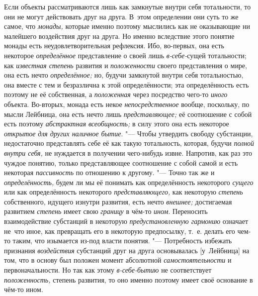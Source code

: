 Если объекты рассматриваются лишь как замкнутые внутри себя
тотальности, то они не могут действовать друг на друга. В~этом определении
они суть то же самое, что {\em монады,}
которые именно поэтому мыслились как не оказывающие ни
малейшего воздействия друг на друга. Но именно вследствие этого понятие
монады есть неудовлетворительная рефлексия. Ибо, во-первых, она есть
некоторое {\em определённое} представление о своей лишь {\em в-себе-}сущей
тотальности; как {\em известная степень} развития и {\em положенности} своего
представления о мире, она есть нечто {\em определённое;} но,
будучи замкнутой внутри себя тотальностью, она вместе с тем и безразлична к
этой определённости; эта определённость есть поэтому не её собственная, а
{\em положенная} через посредство чего-то {\em иного}
объекта. Во-вторых, монада есть некое {\em непосредственное}
вообще, поскольку, по мысли Лейбница, она есть нечто лишь
{\em представляющее;} её соотношение с собой есть поэтому
{\em абстрактная всеобщность;} в силу этого она есть некоторое
{\em открытое} {\em для других наличное бытие}. "---
Чтобы утвердить свободу субстанции, недостаточно представлять
себе её как такую тотальность, которая, будучи {\em полной внутри себя,}
не нуждается в получении чего-нибудь извне. Напротив, как раз
это чуждое понятию, только представляющее соотношение с собой самой и есть
некоторая {\em пассивность} по отношению к другому. "--- Точно так же и
{\em определённость,} будем ли мы её понимать как определённость некоторого
{\em сущего} или как определённость некоторого {\em представляющего,}
как некоторую {\em степень} собственного, идущего изнутри развития, есть нечто
{\em внешнее;} достигаемая развитием {\em степень} имеет свою
{\em границу} в чём-то {\em ином}. Переносить
взаимодействие субстанций в некоторую
{\em предустановленную гармонию}
означает не~что иное, как превращать его в некоторую
предпосылку, т.~е. делать его чем-то таким, что изымается из-под власти
понятия. "--- Потребность избежать признания {\em воздействия}
субстанций друг на друга основывалась [у~Лейбница] на том,
что в основу был положен момент абсолютной
{\em самостоятельности} и первоначальности. Но так как этому
{\em в-себе-бытию} не соответствует {\em положенность,}
степень развития, то оно именно поэтому имеет своё основание в чём-то ином.


